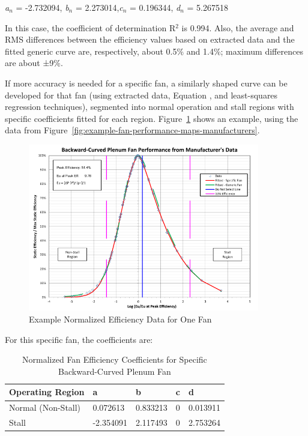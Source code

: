 \emph{a\(_{n}\)} = -2.732094, \emph{b\(_{n}\)} = 2.273014,\emph{c\(_{n}\)} = 0.196344, \emph{d\(_{n}\)} = 5.267518

In this case, the coefficient of determination R\(^{2}\) is 0.994. Also, the average and RMS differences between the efficiency values based on extracted data and the fitted generic curve are, respectively, about 0.5\% and 1.4\%; maximum differences are about ±9\%.

If more accuracy is needed for a specific fan, a similarly shaped curve can be developed for that fan (using extracted data, Equation , and least-squares regression techniques), segmented into normal operation and stall regions with specific coefficients fitted for each region. Figure~\ref{fig:example-normalized-efficiency-data-for-one} shows an example, using the data from Figure~\ref{fig:example-fan-performance-maps-manufacturers}.

\begin{figure}[hbtp] %
\centering
\includegraphics[width=0.9\textwidth, height=0.9\textheight, keepaspectratio=true]{media/image4897.svg.png}
\caption{Example Normalized Efficiency Data for One Fan \protect \label{fig:example-normalized-efficiency-data-for-one}}
\end{figure}

For this specific fan, the coefficients are:

\begin{longtable}[c]{@{}lllll@{}}
\caption{Normalized Fan Efficiency Coefficients for Specific Backward-Curved Plenum Fan \protect \label{table:normalized-fan-efficiency-coefficients-for}}\\
\toprule 
Operating Region & a & b & c & d \tabularnewline \midrule
\endhead
Normal (Non-Stall) & 0.072613 & 0.833213 & 0 & 0.013911 \tabularnewline
Stall & -2.354091 & 2.117493 & 0 & 2.753264 \tabularnewline
\bottomrule
\end{longtable}


